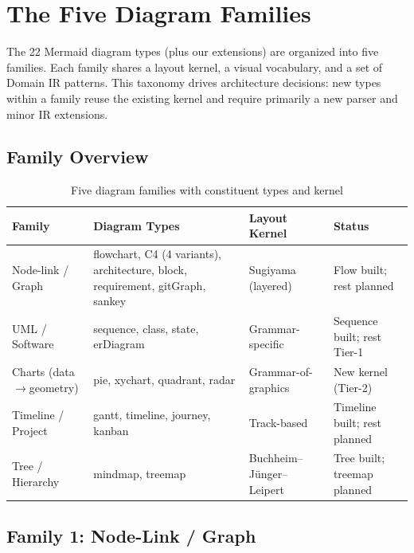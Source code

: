 \section{The Five Diagram Families}
\label{sec:family-taxonomy}

The 22 Mermaid diagram types (plus our extensions) are organized into five families.
Each family shares a layout kernel, a visual vocabulary, and a set of Domain IR patterns.
This taxonomy drives architecture decisions: new types within a family reuse the existing
kernel and require primarily a new parser and minor IR extensions.

\subsection{Family Overview}

\begin{table}[h]
\centering\small
\caption{Five diagram families with constituent types and kernel}
\begin{tabularx}{\textwidth}{lXll}
\toprule
\textbf{Family} & \textbf{Diagram Types} & \textbf{Layout Kernel} & \textbf{Status} \\
\midrule
Node-link / Graph & flowchart, C4 (4 variants), architecture, block, requirement, gitGraph, sankey &
  Sugiyama (layered) & Flow built; rest planned \\
\addlinespace
UML / Software & sequence, class, state, erDiagram &
  Grammar-specific & Sequence built; rest Tier-1 \\
\addlinespace
Charts (data$\to$geometry) & pie, xychart, quadrant, radar &
  Grammar-of-graphics & New kernel (Tier-2) \\
\addlinespace
Timeline / Project & gantt, timeline, journey, kanban &
  Track-based & Timeline built; rest planned \\
\addlinespace
Tree / Hierarchy & mindmap, treemap &
  Buchheim--J\"unger--Leipert & Tree built; treemap planned \\
\bottomrule
\end{tabularx}
\label{tab:family-overview}
\end{table}


\subsection{Family 1: Node-Link / Graph}
\label{sec:family-nodelink}

